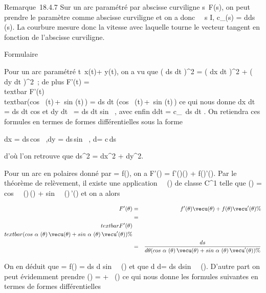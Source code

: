 \documentclass[]{article}
\begin{document}
Remarque~18.4.7 Sur un arc paramétré par abscisse curviligne
s\mapsto~F(s), on peut prendre le paramètre comme
abscisse curviligne et on a donc \forall~~s \in I,
c\_\Gamma(s) = d\phi \over ds (s). La courbure mesure
donc la vitesse avec laquelle tourne le vecteur tangent en fonction de
l'abscisse curviligne.

Formulaire

Pour un arc paramétré
t\mapsto~x(t)\vec\imath +
y(t), on a vu que \left ( ds
\over dt \right )^2 =
\left ( dx \over dt
\right )^2 + \left ( dy
\over dt \right )^2~; de plus
F'(t) =\\textbar{}
F'(t)\\textbar{}(cos~
\phi(t)\,\vec\imath +\
sin \phi(t)\,) = ds
\over dt (cos~
\phi(t)\,\vec\imath +\
sin \phi(t)\,) ce qui nous donne
 dx \over dt = ds \over dt
 cos \phi et  dy \over dt~ =
ds \over dt  sin~ \phi, avec
enfin  d\phi \over dt = c\_\Gamma\,
ds \over dt . On retiendra ces formules en termes de
formes différentielles sous la forme

dx = ds\,cos~
\phi,\quad dy =
ds\,sin~ \phi,\quad
d\phi = c\,ds

d'où l'on retrouve que ds^2 = dx^2 +
dy^2.

Pour un arc en polaires donné par \rho = f(\theta), on a F'(\theta) =
f'(\theta)\vecu(\theta) + f(\theta)\vecu'(\theta). Par
le théorème de relèvement, il existe une application
\theta\mapsto~\alpha~(\theta) de classe C^1 telle que
\vect(\theta) = cos~
\alpha~(\theta)\,\vecu(\theta)
+ sin~
\alpha~(\theta)\,\vecu'(\theta) et on a alors

\begin{align*} F'(\theta)& =&
f'(\theta)\vecu(\theta) + f(\theta)\vecu'(\theta) \%&
\\ & =&
\\textbar{}F'(\theta)\\textbar{}(cos~
\alpha~(\theta)\,\vecu(\theta)
+ sin~
\alpha~(\theta)\,\vecu'(\theta))\%&
\\ & =& ds \over d\theta
(cos~
\alpha~(\theta)\,\vecu(\theta)
+ sin~
\alpha~(\theta)\,\vecu'(\theta)) \%&
\\ \end{align*}

On en déduit que \rho = f(\theta) = ds \over d\theta
 sin~ \alpha~(\theta) et que  d\rho \over
d\theta = ds \over d\theta  sin~
\alpha~(\theta). D'autre part on peut évidemment prendre \phi(\theta) = \theta + \alpha~(\theta) ce qui
nous donne les formules suivantes en termes de formes différentielles
\end{document}
